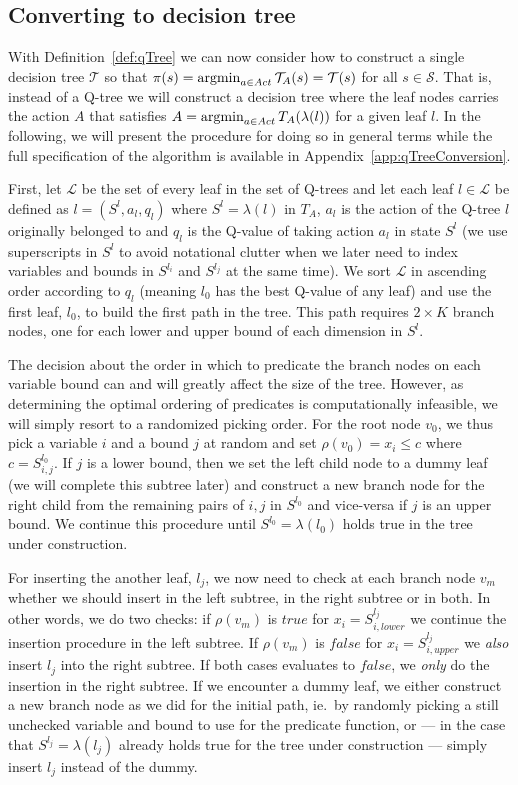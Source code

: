 \subsection{Converting to decision tree}%
\label{subsec:convertQTtoDT}

With Definition~\ref{def:qTree} we can now consider how to construct a single
decision tree $\mathcal{T}$ so that $\pi(s) = \operatorname*{argmin}_{a \in Act}
\mathcal{T}_A(s) = \mathcal{T}(s)$ for all $s \in \mathcal{S}$. That is, instead
of a Q-tree we will construct a decision tree where the leaf nodes carries the
action $A$ that satisfies $A = \operatorname*{argmin}_{a \in Act} T_A(\lambda(l))$ for
a given leaf $l$. In the following, we will present the procedure for doing so
in general terms while the full specification of the algorithm is available in
Appendix~\ref{app:qTreeConversion}.

First, let $\mathcal{L}$ be the set of every leaf in the set of Q-trees and let
each leaf $l \in \mathcal{L}$ be defined as $l = (S^{l}, a_l, q_l)$ where $S^{l} =
\lambda(l)$ in $T_A$, $a_l$ is the action of the Q-tree $l$ originally belonged to
and $q_l$ is the Q-value of taking action $a_l$ in state $S^{l }$ (we use
superscripts in $S^l$ to avoid notational clutter when we later need to index
variables and bounds in $S^{l_i}$ and $S^{l_j}$ at the same time). We sort
$\mathcal{L}$ in ascending order according to $q_l$ (meaning $l_0$ has the best
Q-value of any leaf) and use the first leaf, $l_0$, to build the first path in
the tree. This path requires $2 \times K$ branch nodes, one for each lower and
upper bound of each dimension in  $S^{l}$.

The decision about the order in which to predicate the branch nodes on each
variable bound can and will greatly affect the size of the tree. However, as
determining the optimal ordering of predicates is computationally infeasible, we
will simply resort to a randomized picking order.  For the root node $v_0$, we
thus pick a variable $i$ and a bound $j$ at random and set $\rho(v_0) = x_i \le
c$ where $c = S^{l_0}_{i,j}$. If $j$ is a lower bound, then we set the left
child node to a dummy leaf (we will complete this subtree later) and construct a
new branch node for the right child from the remaining pairs of $i, j$ in
$S^{l_0}$ and vice-versa if $j$ is an upper bound.  We continue this procedure
until $S^{l_0} = \lambda(l_0)$ holds true in the tree under construction.

For inserting the another leaf, $l_j$, we now need to check at each branch node
$v_m$ whether we should insert in the left subtree, in the right subtree or in
both.  In other words, we do two checks: if $\rho(v_m)$ is $true$ for $x_i =
S^{l_j}_{i,lower}$ we continue the insertion procedure in the left subtree.  If
$\rho(v_m)$ is $false$ for $x_i = S^{l_j}_{i, upper}$ we \textit{also} insert
$l_j$ into the right subtree. If both cases evaluates to $false$, we
\textit{only} do the insertion in the right subtree. If we encounter a dummy
leaf, we either construct a new branch node as we did for the initial path, ie.\ by
randomly picking a still unchecked variable and bound to use for the predicate
function, or --- in the case that $S^{l_j} = \lambda(l_j)$ already holds true
for the tree under construction --- simply insert $l_j$ instead of the dummy.


